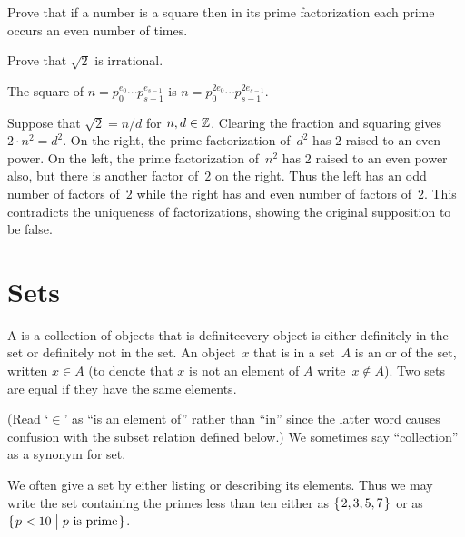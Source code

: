 \documentclass{ibl}
\begin{document}
\begin{ex} 
\begin{exes}
\item Prove that if a number is a square then in its prime factorization 
  each prime occurs an even number of times.
\item Prove that $\sqrt{2}$ is irrational.
\end{exes}
\begin{ans}
\begin{exes}
\item The square of $n=p_0^{e_0}\cdots p_{s-1}^{e_{s-1}}$ is
  $n=p_0^{2e_0}\cdots p_{s-1}^{2e_{s-1}}$.
\item Suppose that $\sqrt{2}=n/d$ for $n,d\in\mathbb{Z}$.
  Clearing the fraction and squaring gives $2\cdot n^2=d^2$.
  On the right, the prime factorization of~$d^2$ has $2$ raised to an even 
  power.
  On the left, the prime factorization of~$n^2$ has $2$ raised to an even power
  also, but there is another factor of~$2$ on the right.
  Thus the left has an odd number of factors of~$2$ while the right has
  and even number of factors of~$2$.
  This contradicts the uniqueness of factorizations, showing the 
  original supposition to be false. 
\end{exes}
\end{ans}
\end{ex}










\chapter{Sets}
\begin{df}
A  is a collection of objects that is definite\Dash every 
object is either
definitely in the set or definitely not in the set.
An object~$x$ that is in a set~$A$ is an 
or 
of the set, written $x\in A$
(to denote that $x$ is not an element of $A$ write~$x\notin A$).
Two sets are equal if they have the same elements.
\end{df}
\noindent (Read `$\in$' as ``is an element of'' rather than ``in'' since the 
latter word causes confusion with 
the subset relation defined below.)
We sometimes say ``collection'' as a synonym for set.

We often give a set by either listing or describing its elements.
Thus we may write 
the set containing the primes less than ten 
either as $\mbox{$\{\hspace{0.1em}2, 3, 5, 7\hspace{0.1em}\}$}$ or as~$\mbox{$\{\hspace{0.1em}p<10\bigm| \text{$p$ is prime}\hspace{0.1em}\}$}$.
\end{document}
